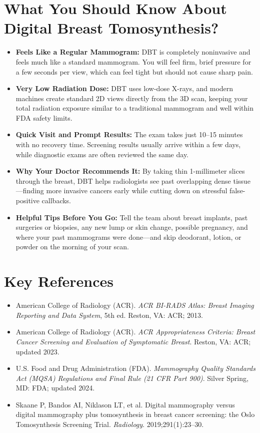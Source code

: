 \section{What You Should Know About Digital Breast Tomosynthesis?}
\begin{itemize}
\item \textbf{Feels Like a Regular Mammogram:} DBT is completely noninvasive and feels much like a standard mammogram. You will feel firm, brief pressure for a few seconds per view, which can feel tight but should not cause sharp pain.
\item \textbf{Very Low Radiation Dose:} DBT uses low-dose X-rays, and modern machines create standard 2D views directly from the 3D scan, keeping your total radiation exposure similar to a traditional mammogram and well within FDA safety limits.
\item \textbf{Quick Visit and Prompt Results:} The exam takes just 10--15 minutes with no recovery time. Screening results usually arrive within a few days, while diagnostic exams are often reviewed the same day.
\item \textbf{Why Your Doctor Recommends It:} By taking thin 1-millimeter slices through the breast, DBT helps radiologists see past overlapping dense tissue---finding more invasive cancers early while cutting down on stressful false-positive callbacks.
\item \textbf{Helpful Tips Before You Go:} Tell the team about breast implants, past surgeries or biopsies, any new lump or skin change, possible pregnancy, and where your past mammograms were done---and skip deodorant, lotion, or powder on the morning of your scan.
\end{itemize}

\section{Key References}
\begin{itemize}
\item American College of Radiology (ACR). \textit{ACR BI-RADS Atlas: Breast Imaging Reporting and Data System}, 5th ed. Reston, VA: ACR; 2013.
\item American College of Radiology (ACR). \textit{ACR Appropriateness Criteria: Breast Cancer Screening and Evaluation of Symptomatic Breast}. Reston, VA: ACR; updated 2023.
\item U.S. Food and Drug Administration (FDA). \textit{Mammography Quality Standards Act (MQSA) Regulations and Final Rule (21 CFR Part 900)}. Silver Spring, MD: FDA; updated 2024.
\item Skaane P, Bandos AI, Niklason LT, et al. Digital mammography versus digital mammography plus tomosynthesis in breast cancer screening: the Oslo Tomosynthesis Screening Trial. \textit{Radiology}. 2019;291(1):23--30.
\end{itemize}
